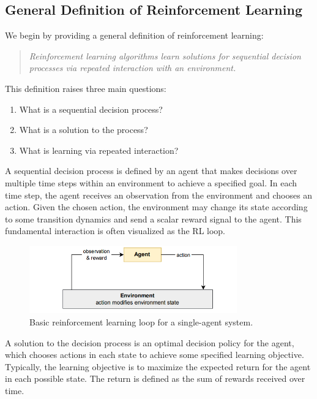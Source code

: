 \subsection*{General Definition of Reinforcement Learning}
We begin by providing a general definition of reinforcement learning:
\begin{quote}
    \textit{Reinforcement learning algorithms learn solutions for sequential decision processes via repeated interaction with an environment.} 
\end{quote}
This definition raises three main questions:
\begin{enumerate}
    \item What is a sequential decision process?
    \item What is a solution to the process?
    \item What is learning via repeated interaction?
\end{enumerate}

A sequential decision process is defined by an agent that makes decisions over multiple time steps within an environment to achieve a specified goal. In each time step, the agent receives an observation from the environment and chooses an action. Given the chosen action, the environment may change its state according to some transition dynamics and send a scalar reward signal to the agent. This fundamental interaction is often visualized as the RL loop.
\begin{figure}[h!]
\centering

 \includegraphics[width=0.8\textwidth]{img_pfe/rl_loop.PNG}
\caption{Basic reinforcement learning loop for a single-agent system.}
\label{fig:rl_loop}
\end{figure}



A solution to the decision process is an optimal decision policy for the agent, which chooses actions in each state to achieve some specified learning objective. Typically, the learning objective is to maximize the expected return for the agent in each possible state. The return is defined as the sum of rewards received over time.

